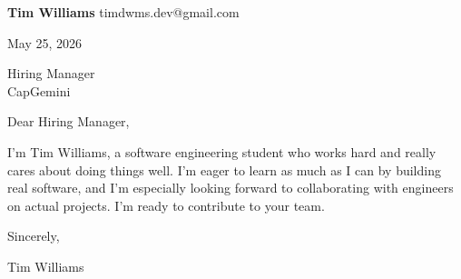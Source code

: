 \documentclass[12pt]{article}
\begin{document}
\textbf{Tim Williams} \hfill timdwms.dev@gmail.com

\vspace{1em}

May 25, 2026

\vspace{1em}

Hiring Manager \\
CapGemini

\vspace{1em}

Dear Hiring Manager,

I'm Tim Williams, a software engineering student who works hard and really cares about doing things well. I'm eager to learn as much as I can by building real software, and I'm especially looking forward to collaborating with engineers on actual projects. I'm ready to contribute to your team.

\vspace{1em}

Sincerely,

\vspace{2em}

Tim Williams
\end{document}
